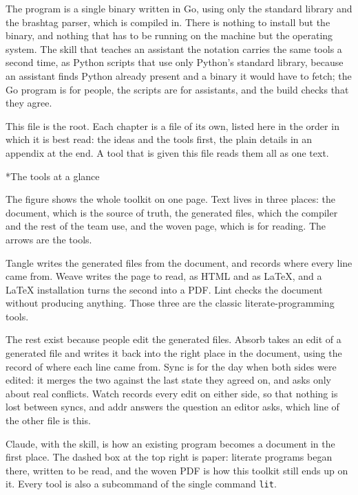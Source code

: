 \documentclass[10pt,a4paper]{article}
\makeatletter
\renewcommand\section{\@startsection{section}{1}{\z@}{-3.2ex \@plus -1ex \@minus -.2ex}{1.2ex \@plus .2ex}{\normalfont\LARGE\itshape}}
\makeatother
\begin{document}
The program is a single binary written in Go, using only the standard library and the brashtag parser, which is compiled in. There is nothing to install but the binary, and nothing that has to be running on the machine but the operating system. The skill that teaches an assistant the notation carries the same tools a second time, as Python scripts that use only Python's standard library, because an assistant finds Python already present and a binary it would have to fetch; the Go program is for people, the scripts are for assistants, and the build checks that they agree.

This file is the root. Each chapter is a file of its own, listed here in the order in which it is best read: the ideas and the tools first, the plain details in an appendix at the end. A tool that is given this file reads them all as one text.

\hypertarget{h-The-tools-at-a-glance}{}
\section*{The tools at a glance}

The figure shows the whole toolkit on one page. Text lives in three places: the document, which is the source of truth, the generated files, which the compiler and the rest of the team use, and the woven page, which is for reading. The arrows are the tools.

Tangle writes the generated files from the document, and records where every line came from. Weave writes the page to read, as HTML and as LaTeX, and a LaTeX installation turns the second into a PDF. Lint checks the document without producing anything. Those three are the classic literate-programming tools.

The rest exist because people edit the generated files. Absorb takes an edit of a generated file and writes it back into the right place in the document, using the record of where each line came from. Sync is for the day when both sides were edited: it merges the two against the last state they agreed on, and asks only about real conflicts. Watch records every edit on either side, so that nothing is lost between syncs, and addr answers the question an editor asks, which line of the other file is this.

Claude, with the skill, is how an existing program becomes a document in the first place. The dashed box at the top right is paper: literate programs began there, written to be read, and the woven PDF is how this toolkit still ends up on it. Every tool is also a subcommand of the single command \texttt{lit}.
\end{document}
